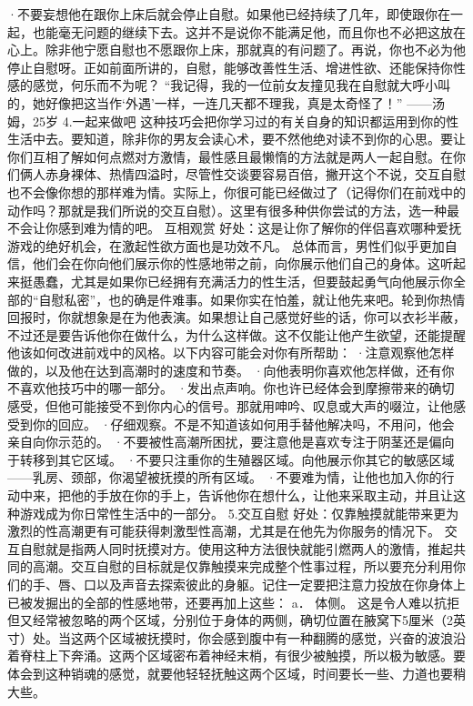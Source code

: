 \documentclass[12pt,UTF8]{ctexbook}
\begin{document}
·不要妄想他在跟你上床后就会停止自慰。如果他已经持续了几年，即使跟你在一起，也能毫无问题的继续下去。这并不是说你不能满足他，而且你也不必把这放在心上。除非他宁愿自慰也不愿跟你上床，那就真的有问题了。再说，你也不必为他停止自慰呀。正如前面所讲的，自慰，能够改善性生活、增进性欲、还能保持你性感的感觉，何乐而不为呢？
“我记得，我的一位前女友撞见我在自慰就大呼小叫的，她好像把这当作‘外遇’一样，一连几天都不理我，真是太奇怪了！”
——汤姆，25岁
4.一起来做吧
这种技巧会把你学习过的有关自身的知识都运用到你的性生活中去。要知道，除非你的男友会读心术，要不然他绝对读不到你的心思。要让你们互相了解如何点燃对方激情，最性感且最懒惰的方法就是两人一起自慰。在你们俩人赤身裸体、热情四溢时，尽管性交谈要容易百倍，撇开这个不说，交互自慰也不会像你想的那样难为情。实际上，你很可能已经做过了（记得你们在前戏中的动作吗？那就是我们所说的交互自慰）。这里有很多种供你尝试的方法，选一种最不会让你感到难为情的吧。
互相观赏
好处：这是让你了解你的伴侣喜欢哪种爱抚游戏的绝好机会，在激起性欲方面也是功效不凡。
总体而言，男性们似乎更加自信，他们会在你向他们展示你的性感地带之前，向你展示他们自己的身体。这听起来挺愚蠢，尤其是如果你已经拥有充满活力的性生活，但要鼓起勇气向他展示你全部的“自慰私密”，也的确是件难事。如果你实在怕羞，就让他先来吧。轮到你热情回报时，你就想象是在为他表演。如果想让自己感觉好些的话，你可以衣衫半蔽，不过还是要告诉他你在做什么，为什么这样做。这不仅能让他产生欲望，还能提醒他该如何改进前戏中的风格。以下内容可能会对你有所帮助：
·注意观察他怎样做的，以及他在达到高潮时的速度和节奏。
·向他表明你喜欢他怎样做，还有你不喜欢他技巧中的哪一部分。
·发出点声响。你也许已经体会到摩擦带来的确切感受，但他可能接受不到你内心的信号。那就用呻吟、叹息或大声的啜泣，让他感受到你的回应。
·仔细观察。不是不知道该如何用手替他解决吗，不用问，他会亲自向你示范的。
·不要被性高潮所困扰，要注意他是喜欢专注于阴茎还是偏向于转移到其它区域。
·不要只注重你的生殖器区域。向他展示你其它的敏感区域——乳房、颈部，你渴望被抚摸的所有区域。
·不要难为情，让他也加入你的行动中来，把他的手放在你的手上，告诉他你在想什么，让他来采取主动，并且让这种游戏成为你日常性生活中的一部分。
5.交互自慰
好处：仅靠触摸就能带来更为激烈的性高潮更有可能获得刺激型性高潮，尤其是在他先为你服务的情况下。
交互自慰就是指两人同时抚摸对方。使用这种方法很快就能引燃两人的激情，推起共同的高潮。交互自慰的目标就是仅靠触摸来完成整个性事过程，所以要充分利用你们的手、唇、口以及声音去探索彼此的身躯。记住一定要把注意力投放在你身体上已被发掘出的全部的性感地带，还要再加上这些：
a． 体侧。
这是令人难以抗拒但又经常被忽略的两个区域，分别位于身体的两侧，确切位置在腋窝下5厘米（2英寸）处。当这两个区域被抚摸时，你会感到腹中有一种翻腾的感觉，兴奋的波浪沿着脊柱上下奔涌。这两个区域密布着神经末梢，有很少被触摸，所以极为敏感。要体会到这种销魂的感觉，就要他轻轻抚触这两个区域，时间要长一些、力道也要稍大些。
\end{document}
